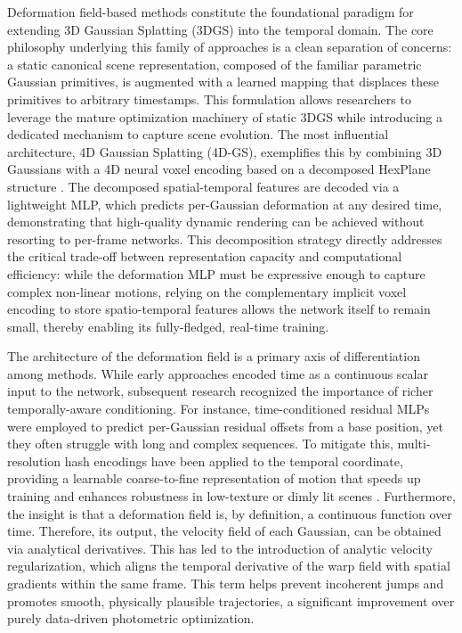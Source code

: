 \documentclass[11pt,a4paper]{article}
\begin{document}
Deformation field-based methods constitute the foundational paradigm for extending 3D Gaussian Splatting (3DGS) into the temporal domain. The core philosophy underlying this family of approaches is a clean separation of concerns: a static canonical scene representation, composed of the familiar parametric Gaussian primitives, is augmented with a learned mapping that displaces these primitives to arbitrary timestamps. This formulation allows researchers to leverage the mature optimization machinery of static 3DGS while introducing a dedicated mechanism to capture scene evolution. The most influential architecture, 4D Gaussian Splatting (4D-GS), exemplifies this by combining 3D Gaussians with a 4D neural voxel encoding based on a decomposed HexPlane structure \cite{arxiv:2310.08528v2}. The decomposed spatial-temporal features are decoded via a lightweight MLP, which predicts per-Gaussian deformation at any desired time, demonstrating that high-quality dynamic rendering can be achieved without resorting to per-frame networks. This decomposition strategy directly addresses the critical trade-off between representation capacity and computational efficiency: while the deformation MLP must be expressive enough to capture complex non-linear motions, relying on the complementary implicit voxel encoding to store spatio-temporal features allows the network itself to remain small, thereby enabling its fully-fledged, real-time training.

The architecture of the deformation field is a primary axis of differentiation among methods. While early approaches encoded time as a continuous scalar input to the network, subsequent research recognized the importance of richer temporally-aware conditioning. For instance, time-conditioned residual MLPs were employed to predict per-Gaussian residual offsets from a base position, yet they often struggle with long and complex sequences. To mitigate this, multi-resolution hash encodings have been applied to the temporal coordinate, providing a learnable coarse-to-fine representation of motion that speeds up training and enhances robustness in low-texture or dimly lit scenes \cite{arxiv:2410.20815v3}. Furthermore, the insight is that a deformation field is, by definition, a continuous function over time. Therefore, its output, the velocity field of each Gaussian, can be obtained via analytical derivatives. This has led to the introduction of analytic velocity regularization, which aligns the temporal derivative of the warp field with spatial gradients within the same frame. This term helps prevent incoherent jumps and promotes smooth, physically plausible trajectories, a significant improvement over purely data-driven photometric optimization.
\end{document}
